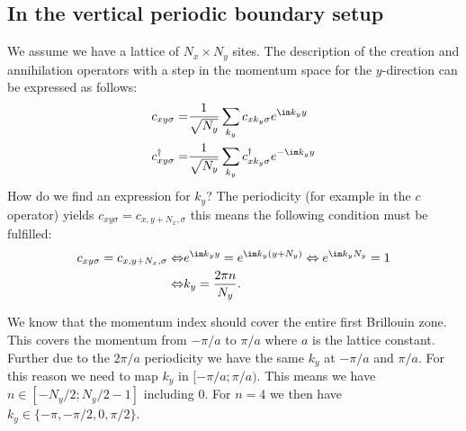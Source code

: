 \documentclass[../main.tex]{subfile}
\begin{document}
\subsection{In the vertical periodic boundary setup}\label{sec:Vertical_Fourier}
We assume we have a lattice of $N_x\times N_y$ sites.
The description of the creation and annihilation operators with a step in the momentum space for the $y$-direction can be expressed as follows:
\begin{align}
    c_{xy\sigma} =& \frac{1}{\sqrt{N_y}} \sum_{k_y} c_{x k_y\sigma} e^{\im k_y y} \label{eq:C_Foruier}\\
    c^{\dagger}_{xy\sigma} =& \frac{1}{\sqrt{N_y}} \sum_{k_y} c^{\dagger}_{x k_y\sigma} e^{-\im k_y y}\label{eq:C_dagg_Foruier}
\end{align}
How do we find an expression for $k_y$? The periodicity (for example in the $c$ operator) yields 
$c_{xy\sigma} = c_{x,y+N_x,\sigma}$ this means the following condition must be fulfilled:
\begin{align*}
    c_{xy\sigma} = c_{x,y+N_x,\sigma} \Leftrightarrow &e^{\im k_y y} = e^{\im k_y (y+N_y)} \Leftrightarrow e^{\im k_y N_y} = 1\\
    \Leftrightarrow &k_y = \frac{2\pi n}{N_y}.
\end{align*}

We know that the momentum index should cover the entire first Brillouin zone. This covers the momentum from $-\pi/a$ to $\pi/a$ 
where $a$ is the lattice constant. Further due to the $2\pi/a$ periodicity we have the same $k_y$ at $-\pi/a$ and $\pi/a$.
For this reason we need to map $k_y $ in $[-\pi/a ;\pi/a)$.
This means we have $n\in \left[-N_y/2  ; N_y/2-1\right]$ including $0$. For $n=4$ we then have $k_y\in\{ -\pi, -\pi/2, 0,  \pi/2\}$. \\
\end{document}
